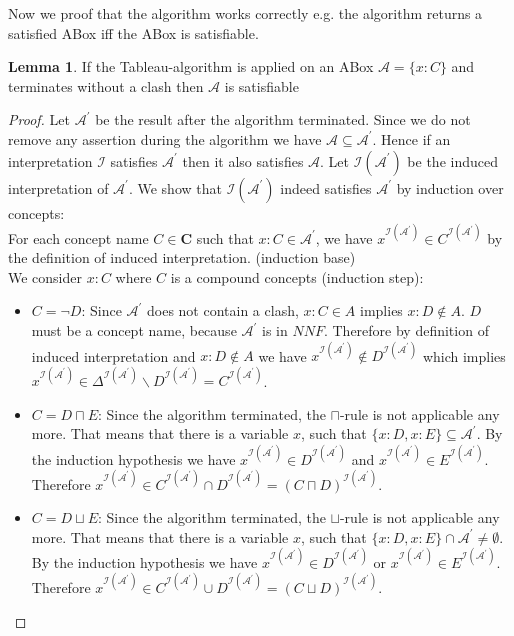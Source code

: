 \documentclass{book}
\theoremstyle{break}
\theoremstyle{definition}
\newtheorem{mylem}{Lemma}
\begin{document}
Now we proof that the algorithm works correctly e.g. the algorithm returns a satisfied ABox iff the ABox is satisfiable.
\begin{mylem}
If the Tableau-algorithm is applied on an ABox $\mathcal{A}=\{x:C\}$ and  terminates without a clash then $\mathcal{A}$ is satisfiable
\end{mylem}
\begin{proof}
Let $\mathcal{A}^\prime$ be the result after the algorithm terminated. Since we do not remove any assertion during the algorithm we have $\mathcal{A}\subseteq\mathcal{A}^\prime$. Hence if an interpretation $\mathcal{I}$ satisfies $\mathcal{A}^\prime$ then it also satisfies $\mathcal{A}$. Let $\mathcal{I}(\mathcal{A}^\prime)$ be the induced interpretation of $\mathcal{A}^\prime$. We show that $\mathcal{I}(\mathcal{A}^\prime)$ indeed satisfies $\mathcal{A}^\prime$ by induction over concepts:\\
For each concept name $C\in\mathbf{C}$ such that $x:C\in\mathcal{A}^\prime$, we have $x^{\mathcal{I}(\mathcal{A}^\prime)}\in C^{\mathcal{I}(\mathcal{A}^\prime)}$ by the definition of induced interpretation. (induction base)\\
We consider $x:C$ where $C$ is a compound concepts (induction step):
\begin{itemize}
\item $C=\neg D$: Since $\mathcal{A}^\prime$ does not contain a clash, $x:C\in A$ implies $x:D\notin A$. $D$ must be a concept name, because $\mathcal{A}^\prime$ is in $NNF$. Therefore by definition of induced interpretation and $x:D\notin A$ we have $x^{\mathcal{I}(\mathcal{A}^\prime)}\notin D^{\mathcal{I}(\mathcal{A}^\prime)}$ which implies $x^{\mathcal{I}(\mathcal{A}^\prime)}\in \Delta^{\mathcal{I}(\mathcal{A}^\prime)}\backslash D^{\mathcal{I}(\mathcal{A}^\prime)}=C^{\mathcal{I}(\mathcal{A}^\prime)}$.
\item $C=D\sqcap E$: Since the algorithm terminated, the $\sqcap$-rule is not applicable any more. That means that there is a variable $x$, such that $\{x:D, x:E\}\subseteq \mathcal{A}^\prime$. By the induction hypothesis we have $x^{\mathcal{I}(\mathcal{A}^\prime)}\in D^{\mathcal{I}(\mathcal{A}^\prime)}$ and $x^{\mathcal{I}(\mathcal{A}^\prime)}\in E^{\mathcal{I}(\mathcal{A}^\prime)}$. Therefore $x^{\mathcal{I}(\mathcal{A}^\prime)}\in C^{\mathcal{I}(\mathcal{A}^\prime)}\cap D^{\mathcal{I}(\mathcal{A}^\prime)}=(C\sqcap D)^{\mathcal{I}(\mathcal{A}^\prime)}$.
\item $C=D\sqcup E$: Since the algorithm terminated, the $\sqcup$-rule is not applicable any more. That means that there is a variable $x$, such that $\{x:D, x:E\}\cap \mathcal{A}^\prime\neq \emptyset$. By the induction hypothesis we have $x^{\mathcal{I}(\mathcal{A}^\prime)}\in D^{\mathcal{I}(\mathcal{A}^\prime)}$ or $x^{\mathcal{I}(\mathcal{A}^\prime)}\in E^{\mathcal{I}(\mathcal{A}^\prime)}$. Therefore $x^{\mathcal{I}(\mathcal{A}^\prime)}\in C^{\mathcal{I}(\mathcal{A}^\prime)}\cup D^{\mathcal{I}(\mathcal{A}^\prime)}=(C\sqcup D)^{\mathcal{I}(\mathcal{A}^\prime)}$.

\end{itemize}
\end{proof}
\end{document}
